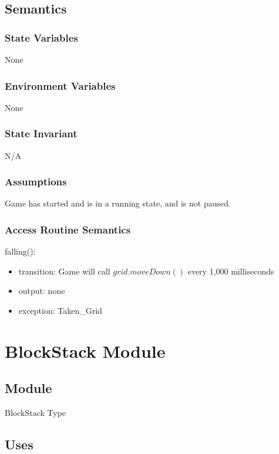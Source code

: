 \documentclass[12pt]{article}
\begin{document}
\subsection* {Semantics}

\subsubsection* {State Variables}

None

\subsubsection* {Environment Variables}
None
\subsubsection* {State Invariant}

N/A

\subsubsection* {Assumptions}
Game has started and is in a running state, and is not paused.

\subsubsection* {Access Routine Semantics}

\noindent falling():
\begin{itemize}
\item transition: Game will call $grid.moveDown()$ every 1,000 milliseconds
\item output: none
\item exception: Taken\_Grid
\end{itemize}

\newpage

\section* {BlockStack Module}

\subsection*{Module}

BlockStack Type

\subsection* {Uses}
\end{document}
